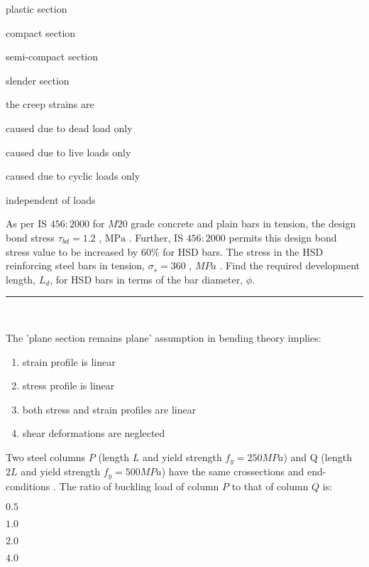 \begin{enumerate}
\begin{multicols}{2}
\item plastic section
\item  compact section  
\item semi-compact section
\item slender section
\end{multicols}
\end{enumerate}
\item the creep strains are 
\begin{enumerate}
\begin{multicols}{2}
\item  caused due to dead load only  
\item  caused due to live loads only 
\item caused due to cyclic loads only 
\item independent of loads 
\end{multicols}
\end{enumerate}
\item As per IS $456:2000$ for $M20$ grade concrete and plain bars in tension, the design bond stress $\tau_{bd} = 1.2 $ , $\text{MPa}$ . Further, IS $456:2000$ permits this design bond stress value to be increased by $60\%$ for HSD bars. The stress in the HSD reinforcing steel bars in tension, $\sigma_s = 360$ ,
$MPa$ . Find the required development length, $L_d$, for HSD bars in terms of the bar diameter, $\phi$. \rule{2cm}{0.4pt} \\
\item The 'plane section remains plane' assumption in bending theory implies: 
\begin{enumerate}
\item strain profile is linear 
\item stress profile is linear
\item both stress and strain profiles are linear 
\item shear deformations are neglected
\end{enumerate}
\item Two steel columns $P$ (length $L$ and yield strength $f_y = 250MPa$) and Q (length $2L$ and yield strength $f_y = 500MPa$) have the same crossections and end-conditions . The ratio of buckling load of column $P$ to that of column $Q$ is: 
\begin{enumerate}
\begin{multicols}{2}
\item $0.5$
\item $1.0$
\item $2.0$
\item $4.0$
\end{multicols}
\end{enumerate}

